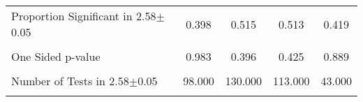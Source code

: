 {\begin{tabular}{l*{4}{c}}
                &                  &                  &                  &                  \\
\hline Proportion Significant in 2.58$\pm$0.05&    0.398         &    0.515         &    0.513         &    0.419         \\
                &                  &                  &                  &                  \\
One Sided p-value&    0.983         &    0.396         &    0.425         &    0.889         \\
                &                  &                  &                  &                  \\
Number of Tests in 2.58$\pm$0.05&   98.000         &  130.000         &  113.000         &   43.000         \\
                &                  &                  &                  &                  \\
\hline\hline
\end{tabular}
}
